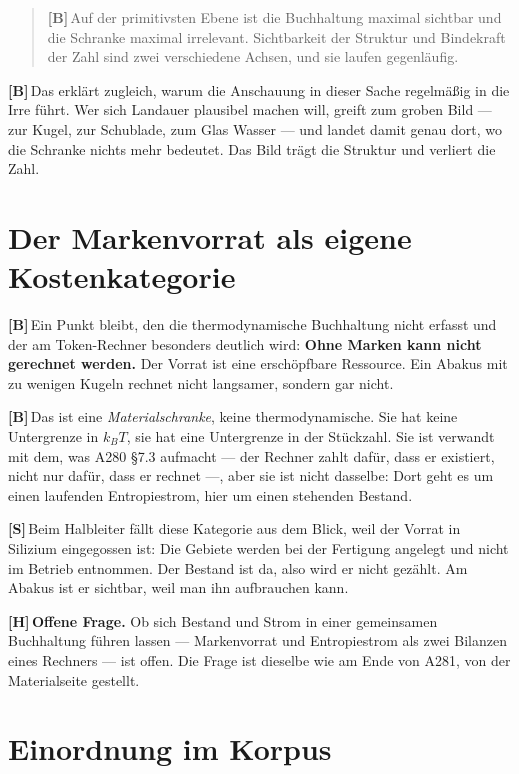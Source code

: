 \documentclass[11pt,a4paper]{article}
\newcommand{\LB}{\textcolor{layB}{\textbf{\footnotesize\textsf{[B]}}}\,}
\newcommand{\LSk}{\textcolor{layS}{\textbf{\footnotesize\textsf{[S]}}}\,}
\newcommand{\LH}{\textcolor{layH}{\textbf{\footnotesize\textsf{[H]}}}\,}
\begin{document}
\begin{quote}
\LB Auf der primitivsten Ebene ist die Buchhaltung maximal sichtbar und die
Schranke maximal irrelevant. Sichtbarkeit der Struktur und Bindekraft der Zahl
sind zwei verschiedene Achsen, und sie laufen gegenläufig.
\end{quote}

\LB Das erklärt zugleich, warum die Anschauung in dieser Sache regelmäßig in die
Irre führt. Wer sich Landauer plausibel machen will, greift zum groben Bild ---
zur Kugel, zur Schublade, zum Glas Wasser --- und landet damit genau dort, wo die
Schranke nichts mehr bedeutet. Das Bild trägt die Struktur und verliert die Zahl.

\section{Der Markenvorrat als eigene Kostenkategorie}

\LB Ein Punkt bleibt, den die thermodynamische Buchhaltung nicht erfasst und der
am Token-Rechner besonders deutlich wird: \textbf{Ohne Marken kann nicht gerechnet
werden.} Der Vorrat ist eine erschöpfbare Ressource. Ein Abakus mit zu wenigen
Kugeln rechnet nicht langsamer, sondern gar nicht.

\LB Das ist eine \emph{Materialschranke}, keine thermodynamische. Sie hat keine
Untergrenze in $k_BT$, sie hat eine Untergrenze in der Stückzahl. Sie ist
verwandt mit dem, was A280 §7.3 aufmacht --- der Rechner zahlt dafür, dass er
existiert, nicht nur dafür, dass er rechnet ---, aber sie ist nicht dasselbe: Dort
geht es um einen laufenden Entropiestrom, hier um einen stehenden Bestand.

\LSk Beim Halbleiter fällt diese Kategorie aus dem Blick, weil der Vorrat in
Silizium eingegossen ist: Die Gebiete werden bei der Fertigung angelegt und nicht
im Betrieb entnommen. Der Bestand ist da, also wird er nicht gezählt. Am Abakus
ist er sichtbar, weil man ihn aufbrauchen kann.

\LH \textbf{Offene Frage.} Ob sich Bestand und Strom in einer gemeinsamen
Buchhaltung führen lassen --- Marken\-vorrat und Entropiestrom als zwei Bilanzen
eines Rechners --- ist offen. Die Frage ist dieselbe wie am Ende von A281, von
der Materialseite gestellt.

\section{Einordnung im Korpus}
\end{document}
